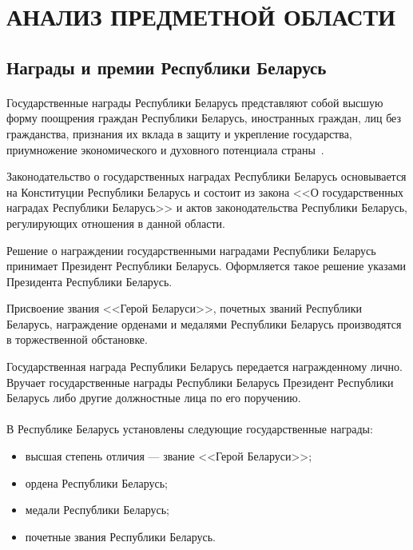 \section[Анализ предметной области]{АНАЛИЗ ПРЕДМЕТНОЙ ОБЛАСТИ}

\subsection{Награды и премии Республики Беларусь}

\paragraph{}
Государственные награды Республики Беларусь представляют собой
высшую форму поощрения граждан Республики Беларусь, иностранных граждан,
лиц без гражданства, признания их вклада в защиту и укрепление государства,
приумножение экономического и духовного потенциала страны~\cite{bel_orders}.

Законодательство о государственных наградах Республики Беларусь основывается
на Конституции Республики Беларусь и состоит из закона
<<О государственных наградах Республики Беларусь>> и актов законодательства
Республики Беларусь, регулирующих отношения в данной области.

Решение о награждении государственными наградами Республики Беларусь
принимает Президент Республики Беларусь.
Оформляется такое решение указами Президента Республики Беларусь.

Присвоение звания <<Герой Беларуси>>, почетных званий Республики Беларусь,
награждение орденами и медалями Республики Беларусь производятся
в торжественной обстановке.

Государственная награда Республики Беларусь передается награжденному лично.
Вручает государственные награды Республики Беларусь
Президент Республики Беларусь либо другие должностные лица по его поручению. 

\paragraph{}
В Республике Беларусь установлены следующие государственные награды:

\begin{itemize}
\item высшая степень отличия --- звание <<Герой Беларуси>>;
\item ордена Республики Беларусь;
\item медали Республики Беларусь;
\item почетные звания Республики Беларусь.
\end{itemize}

